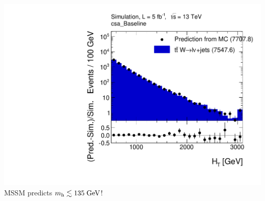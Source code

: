 \documentclass{beamer}
\begin{document}
\begin{frame}
\begin{columns}[T]
\begin{column}{0.3\textwidth}
      \includegraphics[width=\textwidth]{figures/Closure__HT__MCPrMTWDiLep_vs_MCEx__csa_Baseline.pdf}
      \vskip0.2cm
      {\small MSSM predicts $m_{\text{h}}\lesssim135\;\text{Ge}\kern-0.06667em\text{V}$!}
    \end{column}
  \end{columns}
\end{frame}
\end{document}
